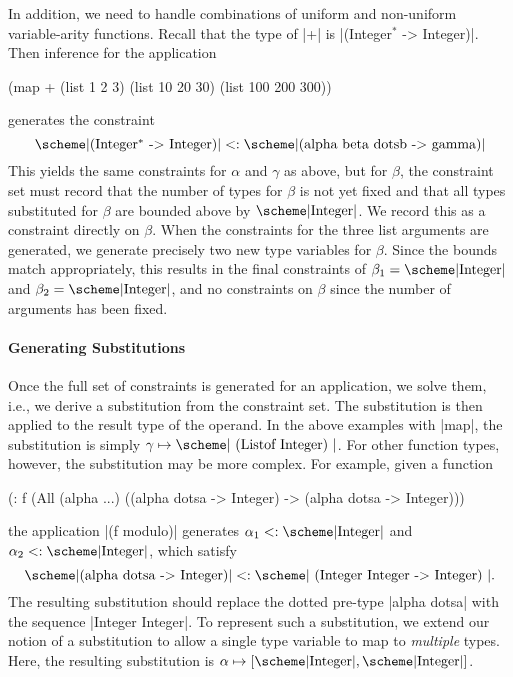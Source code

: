 \begin{schemeregion}
In addition, we need to handle combinations of
uniform and non-uniform variable-arity functions.  Recall that the
type of \scheme|+| is \scheme|(Integer$^*$ -> Integer)|.  Then
inference for the application
\begin{schemedisplay}
(map + (list 1 2 3) (list 10 20 30) (list 100 200 300))
\end{schemedisplay}
generates the constraint
 \[\hbox{\scheme|(Integer$^*$ -> Integer)|} <: \hbox{\scheme|(alpha beta dotsb -> gamma)|}\]
  This yields the same
constraints for $\alpha$ and $\gamma$ as above, but for $\beta$, the
constraint set must record that the number of types for $\beta$ is not
yet fixed and that all types substituted for $\beta$ are bounded
above by $\integer$.  We record this as a constraint directly on
$\beta$.  When the constraints for the three list
arguments are generated, we generate precisely two new type
variables for $\beta$.  Since the bounds match appropriately, this
results in the final constraints of $\beta_1 = \integer$ and
$\beta_2 = \integer$, and no constraints on $\beta$ since the number
of arguments has been fixed.  



\paragraph{Generating Substitutions}

Once the full set of constraints is generated for an
application, we solve them, i.e., we derive a substitution from the constraint
set. The substitution is then applied to the result type of the operand.  In
the above examples with \scheme|map|, the substitution is simply
$\gamma \mapsto \hbox{\scheme| (Listof Integer) |}$.  For other
 function types, however, the substitution may be more
complex.  For example, given a function 
\begin{schemedisplay}
(: f (All (alpha ...) ((alpha dotsa -> Integer) -> (alpha dotsa -> Integer)))
\end{schemedisplay}
 the application \scheme|(f modulo)| generates
 $\alpha_1 <: \integer$ and $\alpha_2 <: \integer$, which satisfy
\[\hbox{\scheme|(alpha dotsa -> Integer)|} <: \hbox{\scheme| (Integer Integer
  -> Integer) |}.\]
The resulting substitution should replace the dotted pre-type
\scheme|alpha dotsa| with the sequence \scheme|Integer Integer|.  To represent such a
substitution, we extend our notion of a substitution to allow a single
type variable to map to \emph{multiple} types.  Here, the resulting
substitution  is $\alpha \mapsto [\integer, \integer]$.


\end{schemeregion}
